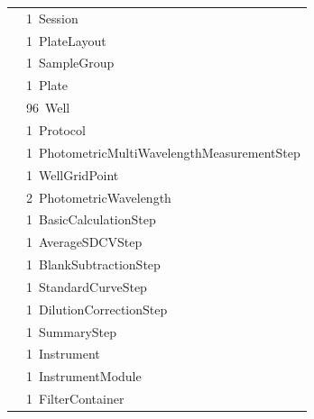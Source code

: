 \documentclass[UTF8,10pt,a4paper,fontset=fandol]{ctexart}
\newcommand{\fieldvalue}[1]{#1}
\begin{document}
\begin{center}
\begin{center}
\begin{tabular}{@{}ll@{}}
&
\fieldvalue{1\ Session}\\
&
\fieldvalue{1\ PlateLayout}\\
&
\fieldvalue{1\ SampleGroup}\\
&
\fieldvalue{1\ Plate}\\
&
\fieldvalue{96\ Well}\\
&
\fieldvalue{1\ Protocol}\\
&
\fieldvalue{1\ PhotometricMultiWavelengthMeasurementStep}\\
&
\fieldvalue{1\ WellGridPoint}\\
&
\fieldvalue{2\ PhotometricWavelength}\\
&
\fieldvalue{1\ BasicCalculationStep}\\
&
\fieldvalue{1\ AverageSDCVStep}\\
&
\fieldvalue{1\ BlankSubtractionStep}\\
&
\fieldvalue{1\ StandardCurveStep}\\
&
\fieldvalue{1\ DilutionCorrectionStep}\\
&
\fieldvalue{1\ SummaryStep}\\
&
\fieldvalue{1\ Instrument}\\
&
\fieldvalue{1\ InstrumentModule}\\
&
\fieldvalue{1\ FilterContainer}\\
\end{tabular}

\medskip



\end{center}
\end{center}
\end{document}
